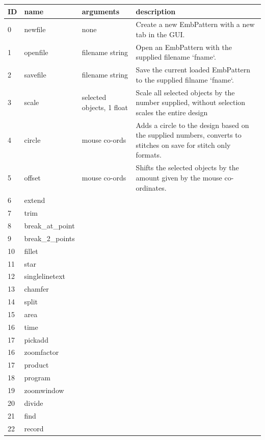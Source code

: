 \documentclass{report}
\begin{document}
\begin{longtable}{l l l p{8cm}}
\textbf{ID} & \textbf{name} & \textbf{arguments} & \textbf{description} \\
\hline
0 & \index{newfile}newfile & none & Create a new EmbPattern with a new tab in the GUI. \\
1 & \index{openfile}openfile & filename string & Open an EmbPattern with the supplied filename `fname`.  \\
2 & \index{savefile}savefile & filename string & Save the current loaded EmbPattern to the supplied filname `fname`. \\
3 & \index{scale}scale & selected objects, 1 float & Scale all selected objects by the number supplied, without selection scales the entire design \\
4 & \index{circle}circle & mouse co-ords & Adds a circle to the design based on the supplied numbers, converts to stitches on save for stitch only formats. \\
5 & \index{offset}offset & mouse co-ords & Shifts the selected objects by the amount given by the mouse co-ordinates.  \\
6 & \index{extend}extend & & \\
7 & \index{trim}trim & & \\
8 & \index{break-at-point}break\_at\_point & & \\
9 & \index{break-2-points}break\_2\_points & & \\
10 & \index{fillet}fillet & & \\
11 & \index{star}star & & \\
12 & \index{singlelinetext}singlelinetext & & \\
13 & \index{chamfer}chamfer & & \\
14 & \index{split}split & & \\
15 & \index{area}area & & \\
16 & \index{time}time & & \\
17 & \index{pickadd}pickadd & & \\
16 & \index{zoomfactor}zoomfactor & & \\
17 & \index{product}product & & \\
18 & \index{program}program & & \\
19 & \index{zoomwindow}zoomwindow & & \\
20 & \index{divide}divide & & \\
21 & \index{find}find & & \\
22 & \index{record}record & & \\

\end{longtable}
\end{document}
